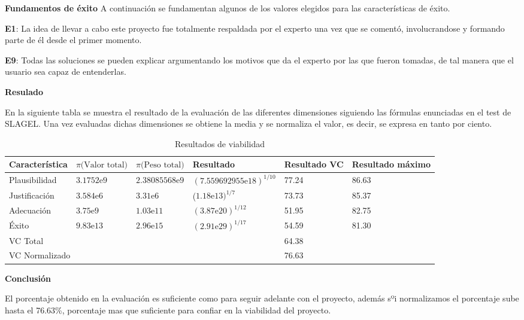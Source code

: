 \textbf{Fundamentos de éxito}
A continuación se fundamentan algunos de los valores elegidos para las características de éxito.

\begin{compactitem}
  \item[\textbf{E1}:] La idea de llevar a cabo este proyecto fue totalmente respaldada
     por el experto una vez que se comentó, involucrandose y formando parte de él desde
     el primer momento.
  \item[\textbf{E9}:] Todas las soluciones se pueden explicar argumentando los motivos
     que da el experto por las que fueron tomadas, de tal manera que el usuario sea
     capaz de entenderlas.
\end{compactitem}

\newpage
\textbf{Resulado}

En la siguiente tabla se muestra el resultado de la evaluación de las diferentes dimensiones
 siguiendo las fórmulas enunciadas en el test de SLAGEL. Una vez evaluadas dichas dimensiones
 se obtiene la media y se normaliza el valor, es decir, se expresa en tanto por ciento.

\begin{table}[htb]%
  \centering
  \caption{Resultados de viabilidad}
  \label{tab:anchura}
  \begin{tabular}{ | l | l | l | l | p{1.5cm} | p{1.5cm} | }
    \hline
    Característica & $\pi\text{(Valor total)}$ & $\pi\text{(Peso total)}$ & Resultado & Resultado VC & Resultado máximo \\ \hline \hline
    Plausibilidad & $3.1752\text{e}9$ & $2.38085568\text{e}9$ & $(7.559692955\text{e}18)^{1/10}$ & 77.24 & 86.63 \\ \hline
    Justificación & $3.584\text{e}6$  & $3.31\text{e}6$ & ($1.18\text{e}13)^{1/7}$ & 73.73 & 85.37 \\ \hline
    Adecuación & $3.75\text{e}9$ & $1.03\text{e}11$ & $(3.87\text{e}20)^{1/12}$ & 51.95 & 82.75 \\ \hline
    Éxito & $9.83\text{e}13$ & $2.96\text{e}15$ & $(2.91\text{e}29)^{1/17}$ & 54.59 & 81.30 \\ \hline \hline
    \multicolumn{4}{|l|}{VC Total} & \multicolumn{2}{l|}{64.38} \\ \hline
    \multicolumn{4}{|l|}{VC Normalizado} & \multicolumn{2}{l|}{76.63} \\ \hline

  \end{tabular}
\end{table}

\textbf{Conclusión}

El porcentaje obtenido en la evaluación es suficiente como para seguir adelante
 con el proyecto, además sºi normalizamos el porcentaje sube hasta el 76.63\%, porcentaje
 mas que suficiente para confiar en la viabilidad del proyecto.



